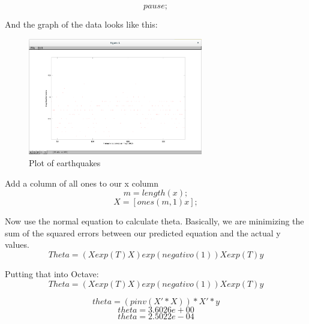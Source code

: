 \documentclass[a4paper,12pt]{article}
\begin{document}
\begin{equation}
    \label{simple_equation}
	pause;
\end{equation}
\par
 And the graph of the data looks like this:
\begin{figure}[H]
    \centering
    \includegraphics[width=3.0in]{img/8.png}
    \caption{Plot of earthquakes}
    \label{simulationfigure}
\end{figure}
\par
Add a column of all ones to our x column
\begin{equation}
    \label{simple_equation}
	m = length(x);
\end{equation}
\begin{equation}
    \label{simple_equation}
	X = [ones(m, 1) x];
\end{equation}
\par
Now use the normal equation to calculate theta. Basically, we are minimizing the sum of the squared errors between our predicted equation and the actual y values. 
\begin{equation}
    \label{simple_equation}
	Theta = (X exp(T) X)exp(negativo(1)) X exp(T)y
\end{equation}
\par
Putting that into Octave:
\begin{equation}
    \label{simple_equation}
	Theta = (X exp(T) X)exp(negativo(1)) X exp(T)y
\end{equation}
\par
\begin{equation}
    \label{simple_equation}
	theta = (pinv(X'*X))*X'*y
\end{equation}
\begin{equation}
    \label{simple_equation}
	theta = 3.6026e+00
\end{equation}
\begin{equation}
    \label{simple_equation}
	theta = 2.5022e-04
\end{equation}
\par
\end{document}
